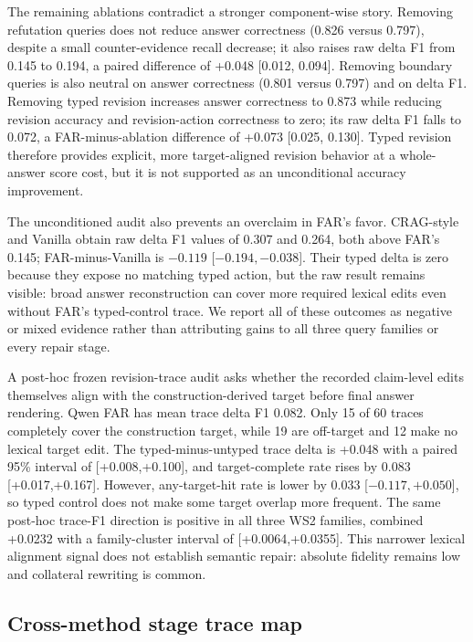 \documentclass[letterpaper]{article}
\begin{document}
The remaining ablations contradict a stronger component-wise story. Removing refutation queries does not reduce answer correctness (0.826 versus 0.797), despite a small counter-evidence recall decrease; it also raises raw delta F1 from 0.145 to 0.194, a paired difference of +0.048 [0.012, 0.094]. Removing boundary queries is also neutral on answer correctness (0.801 versus 0.797) and on delta F1. Removing typed revision increases answer correctness to 0.873 while reducing revision accuracy and revision-action correctness to zero; its raw delta F1 falls to 0.072, a FAR-minus-ablation difference of +0.073 [0.025, 0.130]. Typed revision therefore provides explicit, more target-aligned revision behavior at a whole-answer score cost, but it is not supported as an unconditional accuracy improvement.

The unconditioned audit also prevents an overclaim in FAR's favor. CRAG-style and Vanilla obtain raw delta F1 values of 0.307 and 0.264, both above FAR's 0.145; FAR-minus-Vanilla is $-0.119$ [$-0.194,-0.038$]. Their typed delta is zero because they expose no matching typed action, but the raw result remains visible: broad answer reconstruction can cover more required lexical edits even without FAR's typed-control trace. We report all of these outcomes as negative or mixed evidence rather than attributing gains to all three query families or every repair stage.

A post-hoc frozen revision-trace audit asks whether the recorded claim-level
edits themselves align with the construction-derived target before final answer
rendering. Qwen FAR has mean trace delta F1 0.082. Only 15 of 60 traces completely
cover the construction target, while 19 are off-target and 12 make no lexical
target edit. The typed-minus-untyped trace delta is +0.048 with a paired 95\%
interval of [+0.008,+0.100], and target-complete rate rises by 0.083
[+0.017,+0.167]. However, any-target-hit rate is lower by 0.033
[$-0.117,+0.050$], so typed control does not make some target overlap more
frequent. The same post-hoc trace-F1 direction is positive in all three WS2
families, combined +0.0232 with a family-cluster interval of
[+0.0064,+0.0355]. This narrower lexical alignment signal does not establish
semantic repair: absolute fidelity remains low and collateral rewriting is
common.

\subsection{Cross-method stage trace map}
\end{document}
